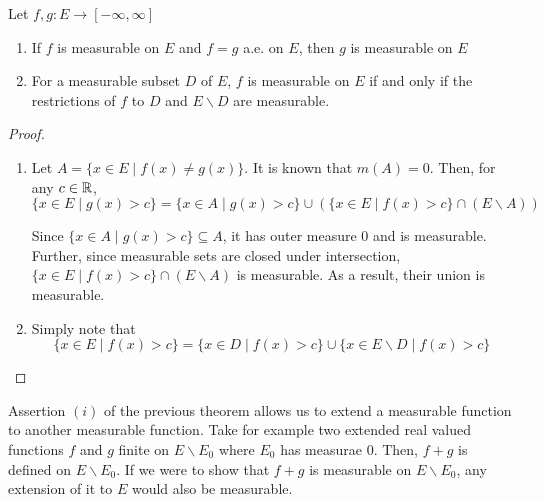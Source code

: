 \begin{proposition}
    Let $f, g: E\to[-\infty,\infty]$
    \begin{enumerate}[label=(\roman*)]
        \item If $f$ is measurable on $E$ and $f = g$ a.e. on $E$, then $g$ is measurable on $E$
        \item For a measurable subset $D$ of $E$, $f$ is measurable on $E$ if and only if the restrictions of $f$ to $D$ and $E\backslash D$ are measurable.
    \end{enumerate}
\end{proposition}
\begin{proof}
\begin{enumerate}[label=(\roman*)]
\item Let $A = \{x\in E\mid f(x)\ne g(x)\}$. It is known that $m(A) = 0$. Then, for any $c\in\mathbb{R}$, 
\begin{equation*}
    \{x\in E\mid g(x) > c\} = \{x\in A\mid g(x) > c\}\cup\left(\{x\in E\mid f(x) > c\}\cap(E\backslash A)\right)
\end{equation*}

Since $\{x\in A\mid g(x) > c\}\subseteq A$, it has outer measure $0$ and is measurable. Further, since measurable sets are closed under intersection, $\{x\in E\mid f(x) > c\}\cap(E\backslash A)$ is measurable. As a result, their union is measurable.

\item Simply note that 
\begin{equation*}
    \{x\in E\mid f(x) > c\} = \{x\in D\mid f(x) > c\}\cup\{x\in E\backslash D\mid f(x) > c\}
\end{equation*}
\end{enumerate}
\end{proof}

Assertion $(i)$ of the previous theorem allows us to extend a measurable function to another measurable function. Take for example two extended real valued functions $f$ and $g$ finite on $E\backslash E_0$ where $E_0$ has measurae $0$. Then, $f + g$ is defined on $E\backslash E_0$. If we were to show that $f + g$ is measurable on $E\backslash E_0$, any extension of it to $E$ would also be measurable.

